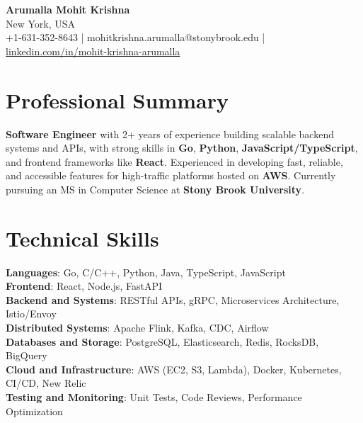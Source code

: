 \documentclass[letterpaper,11pt]{article}
\begin{document}
\begin{center}
  {\Large \textbf{Arumalla Mohit Krishna}} \\
  New York, USA \\
  +1-631-352-8643 \enspace | \enspace mohitkrishna.arumalla@stonybrook.edu \enspace | \enspace \href{https://www.linkedin.com/in/mohit-krishna-arumalla}{linkedin.com/in/mohit-krishna-arumalla}
\end{center}

\section{Professional Summary}
  \begin{itemize}[leftmargin=0.15in, label={}]
    \small{\item{
     \textbf{Software Engineer} with 2+ years of experience building scalable backend systems and APIs, with strong skills in \textbf{Go}, \textbf{Python}, \textbf{JavaScript/TypeScript}, and frontend frameworks like \textbf{React}. Experienced in developing fast, reliable, and accessible features for high-traffic platforms hosted on \textbf{AWS}. Currently pursuing an MS in Computer Science at \textbf{Stony Brook University}.
    }}
  \end{itemize}
\vspace{-16pt}

\section{Technical Skills}
 \begin{itemize}[leftmargin=0.15in, label={}]
    \small{\item{
     \textbf{Languages}: Go, C/C++, Python, Java, TypeScript, JavaScript \\
     \textbf{Frontend}: React, Node.js, FastAPI \\
     \textbf{Backend and Systems}: RESTful APIs, gRPC, Microservices Architecture, Istio/Envoy \\
     \textbf{Distributed Systems}: Apache Flink, Kafka, CDC, Airflow \\
     \textbf{Databases and Storage}: PostgreSQL, Elasticsearch, Redis, RocksDB, BigQuery \\
     \textbf{Cloud and Infrastructure}: AWS (EC2, S3, Lambda), Docker, Kubernetes, CI/CD, New Relic \\
     \textbf{Testing and Monitoring}: Unit Tests, Code Reviews, Performance Optimization \\
    }}
 \end{itemize}
\vspace{-16pt}
\end{document}
